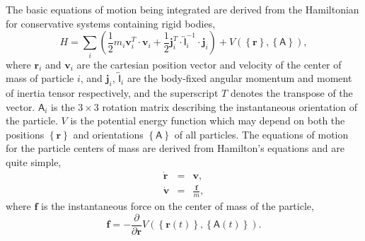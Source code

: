 \documentclass[letterpaper]{report}
\begin{document}
The basic equations of motion being integrated are derived from the
Hamiltonian for conservative systems containing rigid bodies,
\begin{equation}
H = \sum_{i} \left( \frac{1}{2} m_i \mathbf{v}_i^T \cdot \mathbf{v}_i +
\frac{1}{2} \mathbf{j}_i^T \cdot \overleftrightarrow{\mathsf{I}}_i^{-1} \cdot
\mathbf{j}_i \right) +
V\left(\left\{\mathbf{r}\right\}, \left\{\mathsf{A}\right\}\right),
\end{equation}
where $\mathbf{r}_i$ and $\mathbf{v}_i$ are the cartesian position vector
and velocity of the center of mass of particle $i$, and $\mathbf{j}_i$,
$\overleftrightarrow{\mathsf{I}}_i$ are the body-fixed angular
momentum and moment of inertia tensor respectively, and the
superscript $T$ denotes the transpose of the vector.  $\mathsf{A}_i$
is the $3 \times 3$ rotation matrix describing the instantaneous
orientation of the particle.  $V$ is the potential energy function
which may depend on both the positions $\left\{\mathbf{r}\right\}$ and
orientations $\left\{\mathsf{A}\right\}$ of all particles.  The
equations of motion for the particle centers of mass are derived from
Hamilton's equations and are quite simple,
\begin{eqnarray}
\dot{\mathbf{r}} & = & \mathbf{v}, \\
\dot{\mathbf{v}} & = & \frac{\mathbf{f}}{m},
\end{eqnarray}
where $\mathbf{f}$ is the instantaneous force on the center of mass
of the particle,
\begin{equation}
\mathbf{f} = - \frac{\partial}{\partial
\mathbf{r}} V(\left\{\mathbf{r}(t)\right\}, \left\{\mathsf{A}(t)\right\}).
\end{equation}
\end{document}
